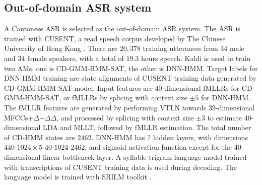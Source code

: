 \documentclass[a4paper]{article}
\begin{document}
\subsection{Out-of-domain ASR system}
\label{subsec:ood_asr}
A Cantonese ASR is selected as the out-of-domain ASR system. 
The ASR is trained with CUSENT, a read speech corpus developed by The Chinese University of Hong Kong \cite{LeeLoChingEtAl2002}. There are $20,378$ training utterances from $34$ male and $34$ female speakers, with a total of $19.3$ hours speech. Kaldi \cite{povey2011kaldi} is used to train two AMs, one is CD-GMM-HMM-SAT, the other is DNN-HMM.  Target labels for DNN-HMM training are state alignments of CUSENT training data generated by CD-GMM-HMM-SAT model.
Input features are $40$-dimensional fMLLRs for CD-GMM-HMM-SAT, or fMLLRs by splicing with context size $\pm 5$ for DNN-HMM. The fMLLR features are generated by performing VTLN towards $39$-dimensional MFCCs+$\Delta$+$\Delta\Delta$, and processed by splicing with context size $\pm 3$ to estimate $40$-dimensional LDA and MLLT, followed by fMLLR estimation. The total number of CD-HMM states are $2462$. DNN-HMM has $7$ hidden layers, with dimensions $440$-$1024\times 5$-$40$-$1024$-$2462$, and sigmoid activation function except for the $40$-dimensional linear bottleneck layer.
A syllable trigram language model trained with transcriptions of CUSENT training data is used during decoding. The language model is trained with SRILM toolkit \cite{Stolcke02srilm--}.
\end{document}
